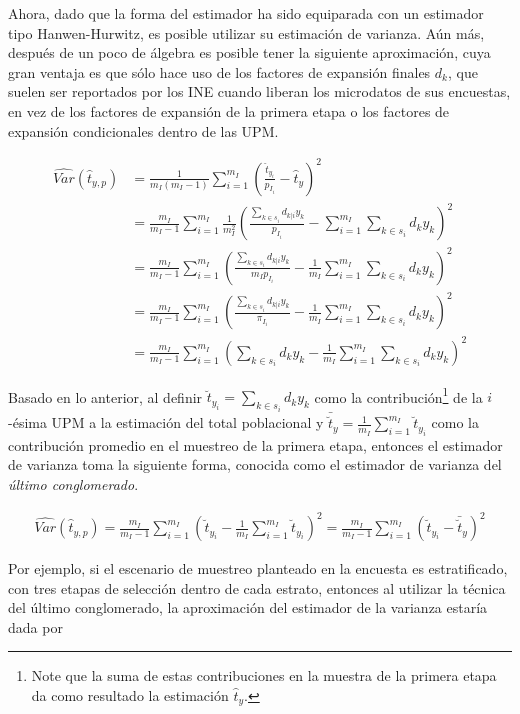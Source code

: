 \documentclass[
  12pt,
  spanish,
]{book}
\begin{document}
Ahora, dado que la forma del estimador ha sido equiparada con un estimador tipo Hanwen-Hurwitz, es posible utilizar su estimación de varianza. Aún más, después de un poco de álgebra es posible tener la siguiente aproximación, cuya gran ventaja es que sólo hace uso de los factores de expansión finales \(d_k\), que suelen ser reportados por los INE cuando liberan los microdatos de sus encuestas, en vez de los factores de expansión de la primera etapa o los factores de expansión condicionales dentro de las UPM.

\begin{align*}
\widehat{Var}(\hat{t}_{y,p})&=\frac{1}{m_I(m_I-1)}\sum_{i=1}^{m_I}\left(\frac{\hat{t}_{y_i}}{p_{I_i}}-\hat{t}_{y}\right)^2\\
&=\frac{m_I}{m_I-1}\sum_{i=1}^{m_I}\frac{1}{m_I^2}\left(\frac{\sum_{k \in s_i} d_{k|i} y_k }{p_{I_i}}-\sum_{i=1}^{m_I}\sum_{k \in s_i} d_k y_k \right)^2 \\
&=\frac{m_I}{m_I-1}\sum_{i=1}^{m_I}\left(\frac{\sum_{k \in s_i} d_{k|i} y_k }{m_I p_{I_i}}-\frac{1}{m_I}\sum_{i=1}^{m_I}\sum_{k \in s_i} d_k y_k \right)^2 \\
&=\frac{m_I}{m_I-1}\sum_{i=1}^{m_I}\left(\frac{\sum_{k \in s_i} d_{k|i} y_k }{\pi_{I_i}}-\frac{1}{m_I}\sum_{i=1}^{m_I}\sum_{k \in s_i} d_k y_k \right)^2 \\
&=\frac{m_I}{m_I-1}\sum_{i=1}^{m_I}\left( \sum_{k \in s_i} d_k y_k -\frac{1}{m_I}\sum_{i=1}^{m_I}\sum_{k \in s_i} d_k y_k \right)^2 
\end{align*}

Basado en lo anterior, al definir \(\breve{t}_{y_i} = \sum_{k \in s_i} d_k y_k\) como la contribución\footnote{Note que la suma de estas contribuciones en la muestra de la primera etapa da como resultado la estimación \(\hat{t}_y\).} de la \(i\)-ésima UPM a la estimación del total poblacional y \(\bar{\breve{t}}_{y}=\frac{1}{m_I}\sum_{i=1}^{m_I}\breve{t}_{y_i}\) como la contribución promedio en el muestreo de la primera etapa, entonces el estimador de varianza toma la siguiente forma, conocida como el estimador de varianza del \emph{último conglomerado}.

\begin{align}
\label{UC}
\widehat{Var}(\hat{t}_{y,p})
=\frac{m_I}{m_I-1}\sum_{i=1}^{m_I}\left( \breve{t}_{y_i} -\frac{1}{m_I}\sum_{i=1}^{m_I}\breve{t}_{y_i} \right)^2 
=\frac{m_I}{m_I-1}\sum_{i=1}^{m_I}\left( \breve{t}_{y_i} - \bar{\breve{t}}_{y} \right)^2
\end{align}

Por ejemplo, si el escenario de muestreo planteado en la encuesta es estratificado, con tres etapas de selección dentro de cada estrato, entonces al utilizar la técnica del último conglomerado, la aproximación del estimador de la varianza estaría dada por
\end{document}
